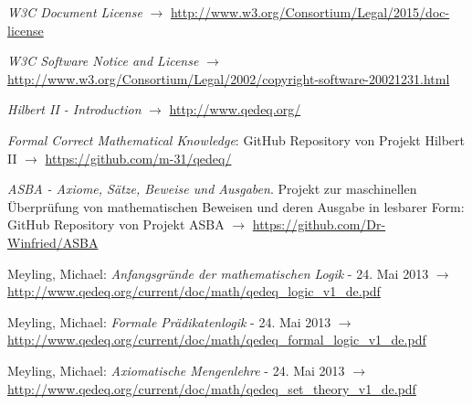 \documentclass[english,ngerman,parskip=half,headsepline,footsepline]{scrreprt}
\begin{document}
\begin{flushleft}
\begin{thebibliography}{12}
			\emph{W3C Document License} $\rightarrow$ \url{http://www.w3.org/Consortium/Legal/2015/doc-license}
			
			\emph{W3C Software Notice and License} $\rightarrow$ \url{http://www.w3.org/Consortium/Legal/2002/copyright-software-20021231.html}
			
			\emph{Hilbert II - Introduction} $\rightarrow$ \url{http://www.qedeq.org/}
			
			\emph{Formal Correct Mathematical Knowledge}: GitHub Repository von Projekt Hilbert II $\rightarrow$ \url{https://github.com/m-31/qedeq/}
			
			\emph{ASBA - Axiome, Sätze, Beweise und Ausgaben}. Projekt zur maschinellen Überprüfung von mathematischen Beweisen und deren Ausgabe in lesbarer Form: GitHub Repository von Projekt ASBA $\rightarrow$ \url{https://github.com/Dr-Winfried/ASBA}
			
			Meyling, Michael: \emph{Anfangsgründe der mathematischen Logik} - 24. Mai 2013 $\rightarrow$ \url{http://www.qedeq.org/current/doc/math/qedeq_logic_v1_de.pdf}
			
			Meyling, Michael: \emph{Formale Prädikatenlogik} - 24. Mai 2013 $\rightarrow$ \url{http://www.qedeq.org/current/doc/math/qedeq_formal_logic_v1_de.pdf}
			
			Meyling, Michael: \emph{Axiomatische Mengenlehre} - 24. Mai 2013 $\rightarrow$ \url{http://www.qedeq.org/current/doc/math/qedeq_set_theory_v1_de.pdf}
			
		\end{thebibliography}
	\end{flushleft}
	\thispagestyle{scrheadings}
	
\end{document}
